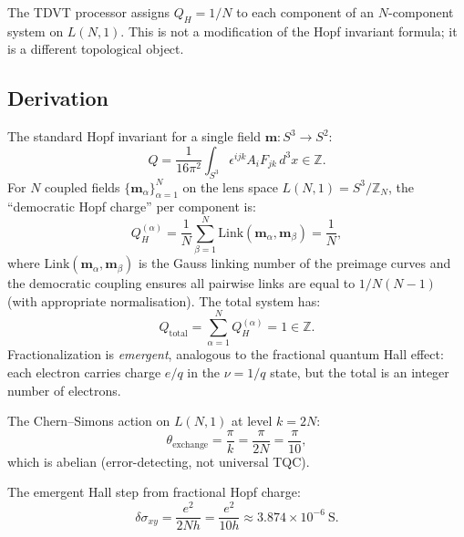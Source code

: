 \documentclass[11pt,letterpaper]{article}
\newcommand{\Qhopf}{Q_H}
\begin{document}
The TDVT processor assigns $\Qhopf = 1/N$ to each component of an $N$-component system on $L(N,1)$.  This is not a modification of the Hopf invariant formula; it is a different topological object.

\subsection{Derivation}
The standard Hopf invariant for a single field $\mathbf{m}: S^3 \to S^2$:
\begin{equation}
  Q = \frac{1}{16\pi^2}\int_{S^3} \epsilon^{ijk} A_i F_{jk}\, d^3x \in \mathbb{Z}.
\end{equation}
For $N$ coupled fields $\{\mathbf{m}_\alpha\}_{\alpha=1}^N$ on the lens space $L(N,1) = S^3/\mathbb{Z}_N$, the ``democratic Hopf charge'' per component is:
\begin{equation}\label{eq:qh_frac}
  \Qhopf^{(\alpha)} = \frac{1}{N}\sum_{\beta=1}^{N} \mathrm{Link}(\mathbf{m}_\alpha, \mathbf{m}_\beta) = \frac{1}{N},
\end{equation}
where $\mathrm{Link}(\mathbf{m}_\alpha, \mathbf{m}_\beta)$ is the Gauss linking number of the preimage curves and the democratic coupling ensures all pairwise links are equal to $1/N(N{-}1)$ (with appropriate normalisation).
The total system has:
\begin{equation}
  Q_{\mathrm{total}} = \sum_{\alpha=1}^{N} \Qhopf^{(\alpha)} = 1 \in \mathbb{Z}.
\end{equation}
Fractionalization is \emph{emergent}, analogous to the fractional quantum Hall effect: each electron carries charge $e/q$ in the $\nu = 1/q$ state, but the total is an integer number of electrons.

The Chern--Simons action on $L(N,1)$ at level $k = 2N$:
\begin{equation}
  \theta_{\mathrm{exchange}} = \frac{\pi}{k} = \frac{\pi}{2N} = \frac{\pi}{10},
\end{equation}
which is abelian (error-detecting, not universal TQC).

The emergent Hall step from fractional Hopf charge:
\begin{equation}\label{eq:hall_step}
  \delta\sigma_{xy} = \frac{e^2}{2Nh} = \frac{e^2}{10h} \approx 3.874 \times 10^{-6}~\text{S}.
\end{equation}
\end{document}
